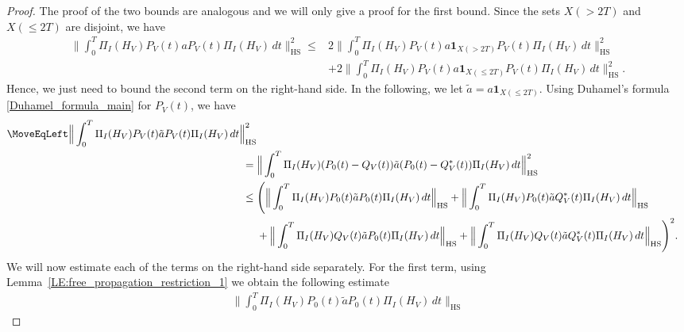 \documentclass[11pt,twoside,reqno]{amsart}
\newcommand{\1}{\mathrm{\mathbf{1}}}
\newcommand{\bHS}{\mathrm{HS}}
\numberwithin{equation}{section}
\theoremstyle{plain}
\theoremstyle{definition}
\theoremstyle{remark}
\begin{document}
\begin{proof}
 The proof of the two bounds are analogous and we will only give a proof for the first bound. Since the sets $X(>2T)$ and $X(\leq 2T)$ are disjoint, we have
        \begin{equation}\label{EQ:lifting_type_lemma_1}
        \begin{aligned}
            \Big\lVert \int_0^T \Pi_I(H_V)P_V(t) a P_V(t)\Pi_I(H_V) \,  d t \Big\rVert_{\bHS}^2 
            \leq{}& 2\Big\lVert \int_0^T \Pi_I(H_V)P_V(t) a \boldsymbol{1}_{X(>2T)} P_V(t) \Pi_I(H_V)\,  d t  \Big\rVert_{\bHS}^2 
            \\
            &+ 2\Big\lVert \int_0^T \Pi_I(H_V)P_V(t) a \boldsymbol{1}_{X(\leq2T)} P_V(t) \Pi_I(H_V)\, d t  \Big\rVert_{\bHS}^2.  
        \end{aligned}
    \end{equation}
    Hence, we just need to bound the second term on the right-hand side. In the following, we let $\tilde{a} = a \boldsymbol{1}_{X(\leq2T)}$. Using Duhamel's formula \eqref{Duhamel_formula_main} for $P_V(t)$, we have
    \begin{equation}\label{EQ:lifting_type_lemma_2}
    \begin{aligned}
        \MoveEqLeft \Big\lVert \int_0^T \Pi_I(H_V)P_V(t) \tilde{a} P_V(t)\Pi_I(H_V) \,  d t  \Big\rVert_{\bHS}^2 
        \\
        ={}& \Big\lVert \int_0^T \Pi_I(H_V)(P_0(t) -Q_V(t)) \tilde{a} (P_0(t) -Q_V^{*}(t))\Pi_I(H_V) \,  d t  \Big\rVert_{\bHS}^2
        \\
        \leq{}& \Bigg( \Big\lVert \int_0^T \Pi_I(H_V)P_0(t)  \tilde{a} P_0(t) \Pi_I(H_V) \,  d t  \Big\rVert_{\bHS}  + \Big\lVert \int_0^T \Pi_I(H_V) P_0(t)  \tilde{a}  Q_V^{*}(t)\Pi_I(H_V) \,  d t  \Big\rVert_{\bHS}
        \\
        &+\Big\lVert \int_0^T \Pi_I(H_V)Q_V(t) \tilde{a} P_0(t) \Pi_I(H_V) \,  d t  \Big\rVert_{\bHS} + \Big\lVert \int_0^T \Pi_I(H_V)Q_V(t) \tilde{a} Q_V^{*}(t)\Pi_I(H_V) \,  d t  \Big\rVert_{\bHS} \Bigg)^2.
    \end{aligned} 
    \end{equation}
    We will now estimate each of the terms on the right-hand side separately. For the first term, using Lemma~\ref{LE:free_propagation_restriction_1} we obtain the following estimate
    \begin{equation}\label{EQ:lifting_type_lemma_3}
    \begin{aligned}
         \Big\lVert \int_0^T \Pi_I(H_V)P_0(t) \tilde{a} P_0(t) \Pi_I(H_V)\, d t \Big\rVert_{\bHS} 

\end{aligned}
\end{equation}
\end{proof}
\end{document}
